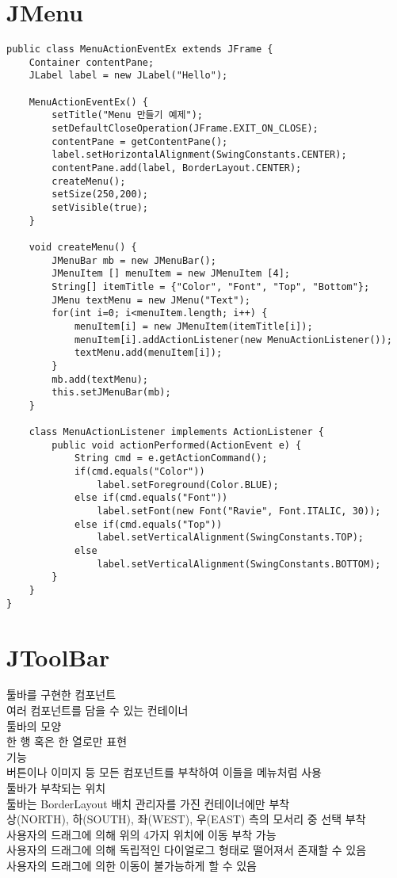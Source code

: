 \section{JMenu}
\begin{verbatim}
public class MenuActionEventEx extends JFrame {
    Container contentPane;
    JLabel label = new JLabel("Hello");

    MenuActionEventEx() {
        setTitle("Menu 만들기 예제");
        setDefaultCloseOperation(JFrame.EXIT_ON_CLOSE);
        contentPane = getContentPane();
        label.setHorizontalAlignment(SwingConstants.CENTER);
        contentPane.add(label, BorderLayout.CENTER);
        createMenu();
        setSize(250,200);
        setVisible(true);
    }

    void createMenu() {
        JMenuBar mb = new JMenuBar();
        JMenuItem [] menuItem = new JMenuItem [4];
        String[] itemTitle = {"Color", "Font", "Top", "Bottom"};
        JMenu textMenu = new JMenu("Text");
        for(int i=0; i<menuItem.length; i++) {
            menuItem[i] = new JMenuItem(itemTitle[i]);
            menuItem[i].addActionListener(new MenuActionListener());
            textMenu.add(menuItem[i]);
        }
        mb.add(textMenu);
        this.setJMenuBar(mb);
    }

    class MenuActionListener implements ActionListener {
        public void actionPerformed(ActionEvent e) {
            String cmd = e.getActionCommand();
            if(cmd.equals("Color"))
                label.setForeground(Color.BLUE);
            else if(cmd.equals("Font"))
                label.setFont(new Font("Ravie", Font.ITALIC, 30));
            else if(cmd.equals("Top"))
                label.setVerticalAlignment(SwingConstants.TOP);
            else
                label.setVerticalAlignment(SwingConstants.BOTTOM);
        }
    }
}
\end{verbatim}

\section{JToolBar}
툴바를 구현한 컴포넌트\\
여러 컴포넌트를 담을 수 있는 컨테이너\\
툴바의 모양\\
한 행 혹은 한 열로만 표현\\
기능\\
버튼이나 이미지 등 모든 컴포넌트를 부착하여 이들을 메뉴처럼 사용\\
툴바가 부착되는 위치\\
툴바는 BorderLayout 배치 관리자를 가진 컨테이너에만 부착\\
상(NORTH), 하(SOUTH), 좌(WEST), 우(EAST) 측의 모서리 중 선택 부착 \\
사용자의 드래그에 의해 위의 4가지 위치에 이동 부착 가능\\
사용자의 드래그에 의해 독립적인 다이얼로그 형태로 떨어져서 존재할 수 있음 \\
사용자의 드래그에 의한 이동이 불가능하게 할 수 있음

